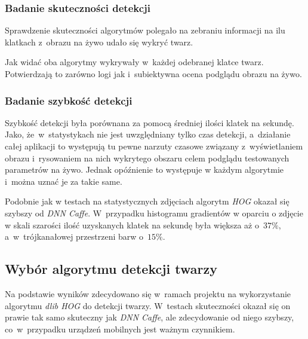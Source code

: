 \subsubsection{Badanie skuteczności detekcji}

Sprawdzenie skuteczności algorytmów polegało na zebraniu informacji na ilu klatkach z~obrazu na żywo udało się wykryć twarz.



Jak widać oba algorytmy wykrywały w~każdej odebranej klatce twarz. Potwierdzają to zarówno logi jak i~subiektywna ocena podglądu obrazu na żywo. 




\subsubsection{Badanie szybkość detekcji} \label{section:face_speed_live}

Szybkość detekcji była porównana za pomocą średniej ilości klatek na sekundę. Jako, że~w~statystykach nie jest uwzględniany tylko czas detekcji, a~działanie całej aplikacji to występują tu pewne narzuty czasowe związany z~wyświetlaniem obrazu i~rysowaniem na nich wykrytego obszaru celem podglądu testowanych parametrów na żywo. Jednak opóźnienie to występuje w każdym algorytmie i~można uznać je za takie same.



Podobnie jak w testach na statystycznych zdjęciach algorytm \textit{HOG} okazał się szybszy od \textit{DNN Caffe}. W~przypadku histogramu gradientów w oparciu o zdjęcie w skali szarości ilość uzyskanych klatek na sekundę była większa aż o~$37 \%$, a~w~trójkanałowej przestrzeni barw o~$15 \%$.


\subsection{Wybór algorytmu detekcji twarzy}

Na podstawie wyników zdecydowano się w~ramach projektu na wykorzystanie algorytmu \textit{dlib HOG} do detekcji twarzy. W~testach skuteczności okazał się on prawie tak samo skuteczny jak \textit{DNN Caffe}, ale zdecydowanie od niego szybszy, co~w~przypadku urządzeń mobilnych jest ważnym czynnikiem.
